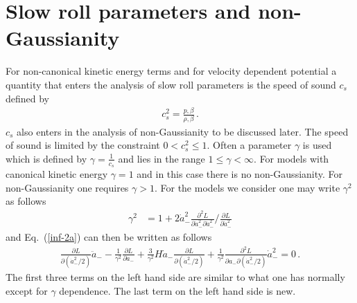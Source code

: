 \documentclass[a4paper,11pt]{article}
\begin{document}
\section{Slow roll parameters and non-Gaussianity \label{sec5}}
  For non-canonical kinetic energy terms and for velocity dependent potential a quantity that enters
  the analysis of slow roll parameters is the speed of sound $c_s$ defined by
  \begin{align}
    c_s^2= \frac{p,\beta}{\rho,\beta}\,.
  \end{align}
  $c_s$ also enters in the analysis of non-Gaussianity to be discussed later.
  The speed of sound is limited by the constraint $0< c_s^2 \leq 1$. Often a parameter $\gamma$ is used which is defined by
  $\gamma = \frac{1}{c_s}$ and lies in the range $1 \leq \gamma < \infty$. For models with canonical kinetic energy $\gamma=1$
  and in this case there is no non-Gaussianity. For non-Gaussianity one requires $\gamma >1$. For the models we consider
  one may write $\gamma^2$ as follows
  \begin{align}
    \gamma^2
    &= 1+ 2 \dot a_{-}^2 \frac{\partial^2 L}{\partial \dot a_{-}^2 \partial \dot a_{-}^2}/\frac{\partial L}{\partial \dot a_{-}^2}
  \end{align}
  and Eq.~(\ref{inf-2a}) can then be written as follows
  \begin{align}
    \frac{\partial L}{\partial( \dot a_{-}^2/2)} \ddot a_{-}
    - \frac{1}{\gamma^2}
    \frac{\partial L}{\partial a_{-}} + \frac{3}{\gamma^2} H \dot a_{-} \frac{\partial L}{\partial (\dot a_{-}^2/2)}
    + \frac{1}{\gamma^2} \frac{\partial^2 L}{\partial a_{-} \partial (\dot a_{-}^2/2)} \dot a_{-}^2
    =0\,.
    \label{inf-2d}
  \end{align}
  The first three terms on the left hand side are similar to what one has normally except for $\gamma$ dependence.
  The last term on the left hand side is new.

\end{document}
